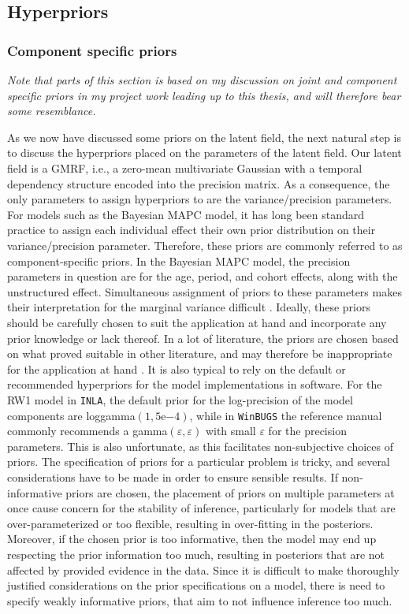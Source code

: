 \subsection{Hyperpriors}
\subsubsection{Component specific priors}
\label{section:component_specific_priors}
\textit{Note that parts of this section is based on my discussion on joint and component specific priors in my project work \citep{Prosjektoppgave} leading up to this thesis, and will therefore bear some resemblance.}

As we now have discussed some priors on the latent field, the next natural step is to discuss the hyperpriors placed on the parameters of the latent field. Our latent field is a GMRF, i.e., a zero-mean multivariate Gaussian with a temporal dependency structure encoded into the precision matrix. As a consequence, the only parameters to assign hyperpriors to are the variance/precision parameters. For models such as the Bayesian MAPC model, it has long been standard practice to assign each individual effect their own prior distribution on their variance/precision parameter. Therefore, these priors are commonly referred to as component-specific priors. In the Bayesian MAPC model, the precision parameters in question are for the age, period, and cohort effects, along with the unstructured effect. Simultaneous assignment of priors to these parameters makes their interpretation for the marginal variance difficult \citep{wakefield2006}. Ideally, these priors should be carefully chosen to suit the application at hand and incorporate any prior knowledge or lack thereof. In a lot of literature, the priors are chosen based on what proved suitable in other literature, and may therefore be inappropriate for the application at hand \citep{PC-priors}. It is also typical to rely on the default or recommended hyperpriors for the model implementations in software. For the RW1 model in \texttt{INLA}, the default prior for the log-precision of the model components are loggamma$(1, 5\mathrm{e}{-4})$, while in \texttt{WinBUGS} the reference manual commonly recommends a gamma$(\varepsilon, \varepsilon)$ with small $\varepsilon$ for the precision parameters. This is also unfortunate, as this facilitates non-subjective choices of priors. The specification of priors for a particular problem is tricky, and several considerations have to be made in order to ensure sensible results. If non-informative priors are chosen, the placement of priors on multiple parameters at once cause concern for the stability of inference, particularly for models that are over-parameterized or too flexible, resulting in over-fitting in the posteriors. Moreover, if the chosen prior is too informative, then the model may end up respecting the prior information too much, resulting in posteriors that are not affected by provided evidence in the data. Since it is difficult to make thoroughly justified considerations on the prior specifications on a model, there is need to specify weakly informative priors, that aim to not influence inference too much.

